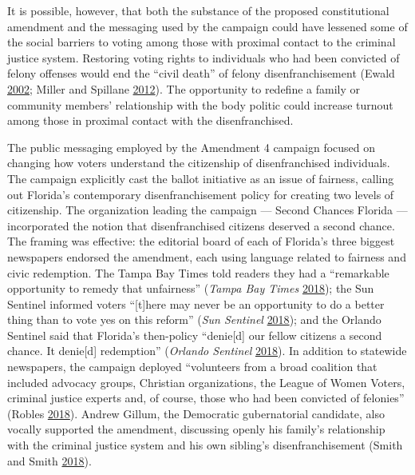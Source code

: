 \documentclass[
  12pt,
]{article}
\begin{document}
It is possible, however, that both the substance of the proposed constitutional amendment and the messaging used by the campaign could have lessened some of the social barriers to voting among those with proximal contact to the criminal justice system. Restoring voting rights to individuals who had been convicted of felony offenses would end the ``civil death'' of felony disenfranchisement (Ewald \protect\hyperlink{ref-Ewald2002}{2002}; Miller and Spillane \protect\hyperlink{ref-Miller2012}{2012}). The opportunity to redefine a family or community members' relationship with the body politic could increase turnout among those in proximal contact with the disenfranchised.

The public messaging employed by the Amendment 4 campaign focused on changing how voters understand the citizenship of disenfranchised individuals. The campaign explicitly cast the ballot initiative as an issue of fairness, calling out Florida's contemporary disenfranchisement policy for creating two levels of citizenship. The organization leading the campaign --- Second Chances Florida --- incorporated the notion that disenfranchised citizens deserved a second chance. The framing was effective: the editorial board of each of Florida's three biggest newspapers endorsed the amendment, each using language related to fairness and civic redemption. The Tampa Bay Times told readers they had a ``remarkable opportunity to remedy that unfairness'' (\emph{Tampa Bay Times} \protect\hyperlink{ref-tampabaytimes2018}{2018}); the Sun Sentinel informed voters ``{[}t{]}here may never be an opportunity to do a better thing than to vote yes on this reform'' (\emph{Sun Sentinel} \protect\hyperlink{ref-SunSentinelEditorial2018}{2018}); and the Orlando Sentinel said that Florida's then-policy ``denie{[}d{]} our fellow citizens a second chance. It denie{[}d{]} redemption'' (\emph{Orlando Sentinel} \protect\hyperlink{ref-ORLANDOSENTINEL2018}{2018}). In addition to statewide newspapers, the campaign deployed ``volunteers from a broad coalition that included advocacy groups, Christian organizations, the League of Women Voters, criminal justice experts and, of course, those who had been convicted of felonies'' (Robles \protect\hyperlink{ref-Robles2018}{2018}). Andrew Gillum, the Democratic gubernatorial candidate, also vocally supported the amendment, discussing openly his family's relationship with the criminal justice system and his own sibling's disenfranchisement (Smith and Smith \protect\hyperlink{ref-Smith2018}{2018}).
\end{document}
